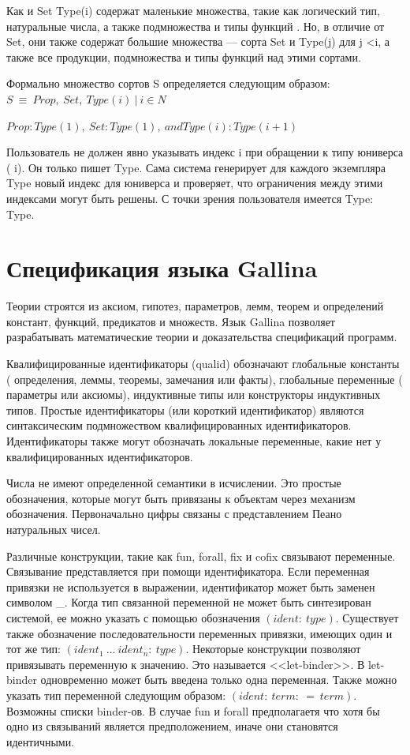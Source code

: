 Как и Set Type(i) содержат маленькие множества, такие как логический тип, 
натуральные числа, а также подмножества и типы функций . Но, в отличие от 
Set, они также содержат большие множества --- сорта Set и Type(j) для j <i, а 
также все продукции, подмножества и типы функций над этими сортами.

Формально множество сортов S определяется следующим образом:
$S \ \equiv \ {Prop, \ Set, \ Type(i) \ | \ i \in N} $


$Prop:Type(1), \ Set:Type(1), \ and Type(i):Type(i+1)$


Пользователь не должен явно указывать индекс i при обращении к типу юниверса (
i). Он только пишет Type. Сама система генерирует для каждого экземпляра Type 
новый индекс для юниверса и проверяет, что ограничения между этими индексами 
могут быть решены. С точки зрения пользователя имеется Type: Type.

\section{Спецификация языка Gallina}

Теории строятся из аксиом, гипотез, параметров, лемм, теорем и определений 
констант, функций, предикатов и множеств. Язык Gallina позволяет 
разрабатывать математические теории и доказательства спецификаций программ.

Квалифицированные идентификаторы (qualid) обозначают глобальные константы (
определения, леммы, теоремы, замечания или факты), глобальные переменные (
параметры или аксиомы), индуктивные типы или конструкторы индуктивных типов. 
Простые идентификаторы (или короткий идентификатор) являются синтаксическим 
подмножеством квалифицированных идентификаторов. Идентификаторы также могут 
обозначать локальные переменные, какие нет у квалифицированных идентификаторов.

Числа не имеют определенной семантики в исчислении. Это простые обозначения, 
которые могут быть привязаны к объектам через механизм обозначения. 
Первоначально цифры связаны с представлением Пеано натуральных
чисел.

Различные конструкции, такие как fun, forall, fix и cofix связывают переменные.
Связывание представляется при помощи идентификатора. Если переменная привязки 
не используется в выражении, идентификатор может быть заменен символом _. 
Когда тип связанной переменной не может быть синтезирован системой, ее можно 
указать с помощью обозначения $(ident: \ type)$. Существует также обозначение 
последовательности переменных привязки, имеющих один и тот же тип: $(ident_{1} \ \ldots \  ident_{n}: \ type)$. Некоторые конструкции позволяют привязывать 
переменную к значению. Это называется <<let-binder>>. В let-binder 
одновременно может быть введена только одна переменная. Также можно указать 
тип переменной следующим образом: $(ident: \ term: \ = \ term)$.
Возможны списки binder-ов. В случае fun и forall предполагаетя что хотя бы 
одно из связываний является предположением, иначе они становятся идентичными.

